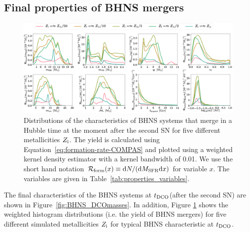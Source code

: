 \documentclass[twocolumn]{aastex63}
\newcommand\bhnsSingle{BHNS\xspace}
\newcommand{\Zi}{\ensuremath{Z_{\rm{i}}}\xspace}
\newcommand{\tDCO}{\ensuremath{{t}_{\rm{DCO}}}\xspace}
\newcommand{\mnsf}{\ensuremath{m_{\rm{NS}}}\xspace}
\newcommand{\mbhf}{\ensuremath{m_{\rm{BH}}}\xspace}
\newcommand{\qf}{\ensuremath{q_{\rm{f}}}\xspace}
\begin{document}


\subsection{Final properties of  \bhnsSingle mergers  }
\label{subsec:bhns-BPS-DCOmasses}
%
%

%
\begin{figure}
\includegraphics[width=1\textwidth]{../PlottingScripts/3_DCO-Population/CombinedZdistributions_horizontal.png}
   \caption{ Distributions of the characteristics of \bhnsSingle systems that merge in a Hubble time at the moment after the second  \ac{SN} for five different metallicities $\Zi$.  The yield is calculated using Equation~\ref{eq:formation-rate-COMPAS} and plotted using a weighted kernel density estimator with a kernel bandwidth of 0.01. We use the short hand notation $\mathcal{R}_{\rm{form}}(x)  \equiv  {\rm{d}}N /({\rm{d}}M_{\rm{SFR}} {\rm{d}}x) $ for variable $x$. The variables are given in Table~\ref{tab:properties_variables}. }
  \label{fig:BHNS_ObservableDistributions_per_metallicity}
\end{figure}
%



The final characteristics of the \bhnsSingle systems at  \tDCO (after the second \ac{SN}) are shown in Figure~\ref{fig:BHNS_DCOmasses}. 
In addition, Figure \ref{fig:BHNS_ObservableDistributions_per_metallicity} shows the weighted histogram distributions (i.e. the yield of  \bhnsSingle mergers) for five different simulated metallicities \Zi  for typical \bhnsSingle characteristic at \tDCO.  
\end{document}

